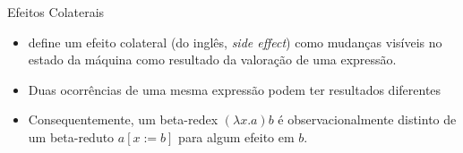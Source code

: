 \begin{frame}{Efeitos Colaterais}
    \begin{itemize}
        \item {} define um efeito colateral (do inglês, \textit{side effect}) como mudanças visíveis no estado da máquina como resultado da valoração de uma expressão.

        \item Duas ocorrências de uma mesma expressão podem ter resultados diferentes

        \item Consequentemente, um beta-redex $(\lambda x.a) b$ é observacionalmente distinto de um beta-reduto $a[x:=b]$ para algum efeito em $b$.
    \end{itemize}
\end{frame}